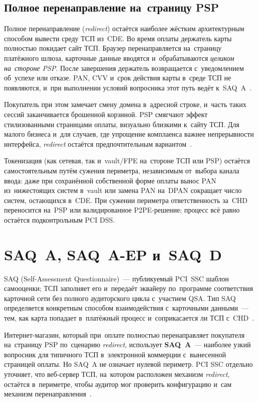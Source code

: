 \subsection*{Полное перенаправление на~страницу PSP}

Полное перенаправление (\textit{redirect}) остаётся наиболее жёстким архитектурным
способом вывести среду ТСП из~CDE. Во время оплаты держатель карты полностью покидает
сайт ТСП. Браузер перенаправляется на~страницу платёжного шлюза, карточные
данные вводятся и~обрабатываются \emph{целиком на~стороне PSP}. После
завершения держатель возвращается с~уведомлением об~успехе или отказе. PAN, CVV
и~срок действия карты в~среде ТСП не появляются, и~при выполнении условий
вопросника этот путь ведёт к~SAQ~A~\cite{pci-saq}.

Покупатель при этом замечает смену домена в~адресной строке, и~часть таких
сессий заканчивается брошенной корзиной. PSP смягчают эффект стилизованными
страницами оплаты, визуально близкими к~сайту ТСП. Для малого бизнеса и~для
случаев, где упрощение комплаенса важнее непрерывности интерфейса, \textit{redirect}
остаётся предпочтительным вариантом~\cite{pci-saq}.

Токенизация (как сетевая, так и~vault/FPE на~стороне ТСП или PSP) остаётся
самостоятельным путём сужения периметра, независимым от~выбора канала ввода:
даже при сохранённой собственной форме оплаты вынос PAN из~нижестоящих систем
в~vault или замена PAN на~DPAN сокращает число систем, остающихся в~CDE.
При сужении периметра ответственность за~CHD переносится на~PSP или
валидированное P2PE-решение; процесс всё равно остаётся подконтрольным PCI DSS.

\section{SAQ~A, SAQ~A-EP и~SAQ~D}\label{sec:pci-saq}

SAQ (Self-Assessment Questionnaire)~--- публикуемый PCI~SSC шаблон
самооценки; ТСП заполняет его и~передаёт эквайеру по~программе соответствия
карточной сети без полного аудиторского цикла с~участием QSA. Тип SAQ
определяется конкретным способом взаимодействия с~карточными данными~--- тем,
как карта попадает в~платёжный процесс и~соприкасается ли ТСП
с~CHD~\cite{pci-saq}.

Интернет-магазин, который при~оплате полностью перенаправляет покупателя
на~страницу PSP по~сценарию \textit{redirect}, использует \textbf{SAQ~A}~--- наиболее
узкий вопросник для типичного ТСП в~электронной коммерции с~вынесенной
страницей оплаты. Но SAQ~A не означает нулевой периметр. PCI SSC отдельно
уточняет, что веб-сервер ТСП, на~котором расположен механизм \textit{redirect}, остаётся
в~периметре, чтобы аудитор мог проверить конфигурацию и~сам механизм
перенаправления~\cite{pci-faq-1332}.

